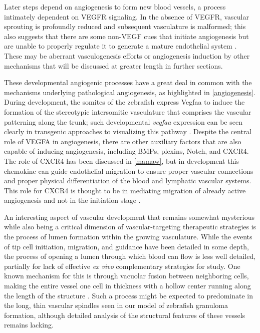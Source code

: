 Later steps depend on angiogenesis to form new blood vessels, a process intimately dependent on VEGFR signaling. In the absence of VEGFR, vascular sprouting is profoundly reduced and subsequent vasculature is malformed; this also suggests that there are some non\hyp{}VEGF cues that initiate angiogenesis but are unable to properly regulate it to generate a mature endothelial system \citep{Hogan2017}. These may be aberrant vasculogenesis efforts or angiogenesis induction by other mechanisms that will be discussed at greater length in further sections.

These developmental angiogenic processes have a great deal in common with the mechanisms underlying pathological angiogenesis, as highlighted in \autoref{angiogenesis}. During development, the somites of the zebrafish express Vegfaa to induce the formation of the stereotypic intersomitic vasculature that comprises the vascular patterning along the trunk; such developmental \textit{vegfaa} expression can be seen clearly in transgenic approaches to visualizing this pathway \citep{Karra2018, Walton2018}. Despite the central role of VEGFA in angiogenesis, there are other auxiliary factors that are also capable of inducing angiogenesis, including BMPs, plexins, Notch, and CXCR4. The role of CXCR4 has been discussed in \autoref{mamaw}, but in development this chemokine can guide endothelial migration to ensure proper vascular connections and proper physical differentiation of the blood and lymphatic vascular systems. This role for CXCR4 is thought to be in mediating migration of already active angiogenesis and not in the initiation stage \citep{Schuermann2014}.

An interesting aspect of vascular development that remains somewhat mysterious while also being a critical dimension of vascular\hyp{}targeting therapeutic strategies is the process of lumen formation within the growing vasculature. While the events of tip cell initiation, migration, and guidance have been detailed in some depth, the process of opening a lumen through which blood can flow is less well detailed, partially for lack of effective \textit{ex vivo} complementary strategies for study. One known mechanism for this is through vacuolar fusion between neighboring cells, making the entire vessel one cell in thickness with a hollow center running along the length of the structure \citep{Kamei2006}. Such a process might be expected to predominate in the long, thin vascular spindles seen in our model of zebrafish granuloma formation, although detailed analysis of the structural features of these vessels remains lacking.

